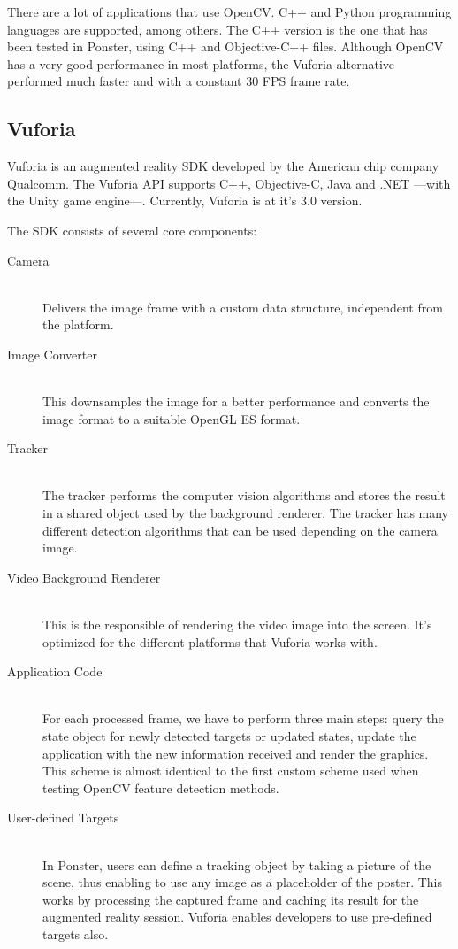 There are a lot of applications that use OpenCV. C++ and Python programming
languages are supported, among others. The C++ version is the one that has been
tested in Ponster, using C++ and Objective-C++ files. Although OpenCV has a
very good performance in most platforms, the Vuforia alternative performed much
faster and with a constant 30 FPS frame rate.

\subsection{Vuforia}
\label{sec:vuforia}
Vuforia is an augmented reality SDK developed by the American chip company
Qualcomm. The Vuforia API supports C++, Objective-C, Java and .NET
---with the Unity game engine---. Currently, Vuforia is at it's 3.0 version. 

The SDK consists of several core components\cite{vuforiasdk01}: 
\begin{description}
\item [Camera] \hfill \\
Delivers the image frame with a custom data structure, independent from the
platform.
\item [Image Converter] \hfill \\
This downsamples the image for a better performance and converts the image format to
a suitable OpenGL ES format.
\item [Tracker] \hfill \\
The tracker performs the computer vision algorithms and stores the result in a
shared object used by the background renderer. The tracker has many different
detection algorithms that can be used depending on the camera image.
\item [Video Background Renderer] \hfill \\
This is the responsible of rendering the video image into the screen. It's optimized
for the different platforms that Vuforia works with.
\item [Application Code] \hfill \\
For each processed frame, we have to perform three main steps: query the state
object for newly detected targets or updated states, update the application with the
new information received and render the graphics. This scheme is almost identical to
the first custom scheme used when testing OpenCV feature detection methods.
\item [User-defined Targets] \hfill \\
In Ponster, users can define a tracking object by taking a picture of the scene,
thus enabling to use any image as a placeholder of the poster. This works by
processing the captured frame and caching its result for the augmented reality
session. Vuforia enables developers to use pre-defined targets also.
\end{description}

